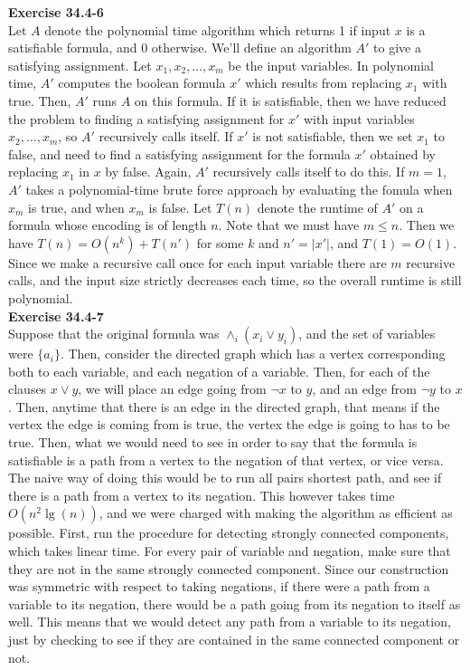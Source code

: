 \documentclass{article}
\begin{document}
\noindent\textbf{Exercise 34.4-6}\\

Let $A$ denote the polynomial time algorithm which returns 1 if input $x$ is a satisfiable formula, and 0 otherwise.  We'll define an algorithm $A'$ to give a satisfying assignment.  Let $x_1, x_2, \ldots, x_m$ be the input variables.  In polynomial time, $A'$ computes the boolean formula $x'$ which results from replacing $x_1$ with true. Then, $A'$ runs $A$ on this formula.  If it is satisfiable, then we have reduced the problem to finding a satisfying assignment for $x'$ with input variables $x_2, \ldots, x_m$, so $A'$ recursively calls itself.  If $x'$ is not satisfiable, then we set $x_1$ to false, and need to find a satisfying assignment for the formula $x'$ obtained by replacing $x_1$ in $x$ by false.  Again, $A'$ recursively calls itself to do this.  If $m=1$, $A'$ takes a polynomial-time brute force approach by evaluating the fomula when $x_m$ is true, and when $x_m$ is false.  Let $T(n)$ denote the runtime of $A'$ on a formula whose encoding is of length $n$.  Note that we must have $m \leq n$.  Then we have $T(n) = O(n^k) + T(n')$ for some $k$ and $n' = |x'|$, and $T(1) = O(1)$.  Since we make a recursive call once for each input variable there are $m$ recursive calls, and the input size strictly decreases each time, so the overall runtime is still polynomial.  \\

\noindent\textbf{Exercise 34.4-7}\\
Suppose that the original formula was $\wedge_i (x_i \vee y_i)$, and the set of variables were $\{a_i\}$. Then, consider the directed graph which has a vertex corresponding both to each variable, and each negation of a variable. Then, for each of the clauses $x \vee y$, we will place an edge going from $\neg x$ to $y$, and an edge from $\neg y$ to $x$. Then, anytime that there is an edge in the directed graph, that means if the vertex the edge is coming from is true, the vertex the edge is going to has to be true. Then, what we would need to see in order to say that the formula is satisfiable is a path from a vertex to the negation of that vertex, or vice versa. The naive way of doing this would be to run all pairs shortest path, and see if there is a path from a vertex to its negation. This however takes time $O(n^2\lg(n))$, and we were charged with making the algorithm as efficient as possible. First, run the procedure for detecting strongly connected components, which takes linear time. For every pair of variable and negation, make sure that they are not in the same strongly connected component. Since our construction was symmetric with respect to taking negations, if there were a path from a variable to its negation, there would be a path going from its negation to itself as well. This means that we would detect any path from a variable to its negation, just by checking to see if they are contained in the same connected component or not.\\
\end{document}
